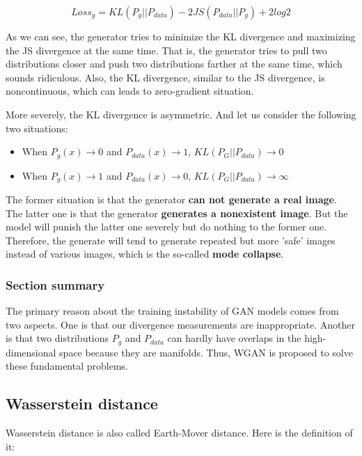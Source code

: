 \documentclass{article} %
\begin{document}
\begin{equation}
    Loss_g = KL(P_g||P_{data}) - 2JS(P_{data}||P_g)+2log2
\end{equation}

As we can see, the generator tries to minimize the KL divergence and maximizing the JS divergence at the same time. That is, the generator tries to pull two distributions closer and push two distributions farther at the same time, which sounds ridiculous. Also, the KL divergence, similar to the JS divergence, is noncontinuous, which can leads to zero-gradient situation.

More severely, the KL divergence is asymmetric. And let us consider the following two situations:

\begin{itemize}
    \item When $P_g(x) \rightarrow 0$ and $P_{data}(x) \rightarrow 1$, $KL(P_G||P_{data}) \rightarrow 0$
    \item When $P_g(x) \rightarrow 1$ and $P_{data}(x) \rightarrow 0$, $KL(P_G||P_{data}) \rightarrow \infty$
\end{itemize}

The former situation is that the generator \textbf{can not generate a real image}. The latter one is that the generator \textbf{generates a nonexistent image}. But the model will punish the latter one severely but do nothing to the former one. Therefore, the generate will tend to generate repeated but more 'safe' images instead of various images, which is the so-called \textbf{mode collapse}.

\subsubsection{Section summary}

The primary reason about the training instability of GAN models comes from two aspects. One is that our divergence measurements are inappropriate. Another is that two distributions $P_g$ and $P_{data}$ can hardly have overlaps in the high-dimensional space because they are manifolds. Thus, WGAN is proposed to solve these fundamental problems.

\subsection{Wasserstein distance}

Wasserstein distance is also called Earth-Mover distance. Here is the definition of it:
\end{document}
